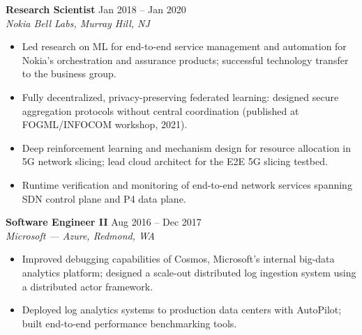 \documentclass[11pt]{article}
\newcommand{\role}[4]{\textbf{#1} \hfill #4\\ \textit{#2, #3}\vspace{2pt}}
\begin{document}
\role{Research Scientist}{Nokia Bell Labs}{Murray Hill, NJ}{Jan 2018 -- Jan 2020}
\begin{itemize}[leftmargin=14pt, itemsep=1pt, topsep=2pt]
\item Led research on ML for end-to-end service management and automation for Nokia's orchestration and assurance products; successful technology transfer to the business group.
\item Fully decentralized, privacy-preserving federated learning: designed secure aggregation protocols without central coordination (published at FOGML/INFOCOM workshop, 2021).
\item Deep reinforcement learning and mechanism design for resource allocation in 5G network slicing; lead cloud architect for the E2E 5G slicing testbed.
\item Runtime verification and monitoring of end-to-end network services spanning SDN control plane and P4 data plane.
\end{itemize}

\role{Software Engineer II}{Microsoft --- Azure}{Redmond, WA}{Aug 2016 -- Dec 2017}
\begin{itemize}[leftmargin=14pt, itemsep=1pt, topsep=2pt]
\item Improved debugging capabilities of Cosmos, Microsoft's internal big-data analytics platform; designed a scale-out distributed log ingestion system using a distributed actor framework.
\item Deployed log analytics systems to production data centers with AutoPilot; built end-to-end performance benchmarking tools.
\end{itemize}
\end{document}
